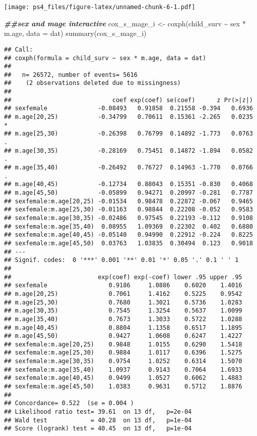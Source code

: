 \documentclass[
]{article}
\newenvironment{Shaded}{\begin{snugshade}}{\end{snugshade}}
\newcommand{\AttributeTok}[1]{\textcolor[rgb]{0.77,0.63,0.00}{#1}}
\newcommand{\DocumentationTok}[1]{\textcolor[rgb]{0.56,0.35,0.01}{\textbf{\textit{#1}}}}
\newcommand{\FunctionTok}[1]{\textcolor[rgb]{0.00,0.00,0.00}{#1}}
\newcommand{\NormalTok}[1]{#1}
\newcommand{\OtherTok}[1]{\textcolor[rgb]{0.56,0.35,0.01}{#1}}
\newcommand{\SpecialCharTok}[1]{\textcolor[rgb]{0.00,0.00,0.00}{#1}}
\begin{document}
\texttt{[image: ps4\_files/figure-latex/unnamed-chunk-6-1.pdf]}

\begin{Shaded}
\begin{Highlighting}[]
\DocumentationTok{\#\#sex and mage interactive}
\NormalTok{cox\_s\_mage\_i }\OtherTok{\textless{}{-}} \FunctionTok{coxph}\NormalTok{(child\_surv }\SpecialCharTok{\textasciitilde{}}\NormalTok{ sex }\SpecialCharTok{*}\NormalTok{ m.age, }\AttributeTok{data =}\NormalTok{ dat)}
\FunctionTok{summary}\NormalTok{(cox\_s\_mage\_i)}
\end{Highlighting}
\end{Shaded}

\begin{verbatim}
## Call:
## coxph(formula = child_surv ~ sex * m.age, data = dat)
## 
##   n= 26572, number of events= 5616 
##    (2 observations deleted due to missingness)
## 
##                            coef exp(coef) se(coef)      z Pr(>|z|)  
## sexfemale              -0.08493   0.91858  0.21558 -0.394   0.6936  
## m.age[20,25)           -0.34799   0.70611  0.15361 -2.265   0.0235 *
## m.age[25,30)           -0.26398   0.76799  0.14892 -1.773   0.0763 .
## m.age[30,35)           -0.28169   0.75451  0.14872 -1.894   0.0582 .
## m.age[35,40)           -0.26492   0.76727  0.14963 -1.770   0.0766 .
## m.age[40,45)           -0.12734   0.88043  0.15351 -0.830   0.4068  
## m.age[45,50)           -0.05899   0.94271  0.20997 -0.281   0.7787  
## sexfemale:m.age[20,25) -0.01534   0.98478  0.22872 -0.067   0.9465  
## sexfemale:m.age[25,30) -0.01163   0.98844  0.22208 -0.052   0.9583  
## sexfemale:m.age[30,35) -0.02486   0.97545  0.22193 -0.112   0.9108  
## sexfemale:m.age[35,40)  0.08955   1.09369  0.22302  0.402   0.6880  
## sexfemale:m.age[40,45) -0.05140   0.94990  0.22912 -0.224   0.8225  
## sexfemale:m.age[45,50)  0.03763   1.03835  0.30494  0.123   0.9018  
## ---
## Signif. codes:  0 '***' 0.001 '**' 0.01 '*' 0.05 '.' 0.1 ' ' 1
## 
##                        exp(coef) exp(-coef) lower .95 upper .95
## sexfemale                 0.9186     1.0886    0.6020    1.4016
## m.age[20,25)              0.7061     1.4162    0.5225    0.9542
## m.age[25,30)              0.7680     1.3021    0.5736    1.0283
## m.age[30,35)              0.7545     1.3254    0.5637    1.0099
## m.age[35,40)              0.7673     1.3033    0.5722    1.0288
## m.age[40,45)              0.8804     1.1358    0.6517    1.1895
## m.age[45,50)              0.9427     1.0608    0.6247    1.4227
## sexfemale:m.age[20,25)    0.9848     1.0155    0.6290    1.5418
## sexfemale:m.age[25,30)    0.9884     1.0117    0.6396    1.5275
## sexfemale:m.age[30,35)    0.9754     1.0252    0.6314    1.5070
## sexfemale:m.age[35,40)    1.0937     0.9143    0.7064    1.6933
## sexfemale:m.age[40,45)    0.9499     1.0527    0.6062    1.4883
## sexfemale:m.age[45,50)    1.0383     0.9631    0.5712    1.8876
## 
## Concordance= 0.522  (se = 0.004 )
## Likelihood ratio test= 39.61  on 13 df,   p=2e-04
## Wald test            = 40.28  on 13 df,   p=1e-04
## Score (logrank) test = 40.45  on 13 df,   p=1e-04
\end{verbatim}
\end{document}
